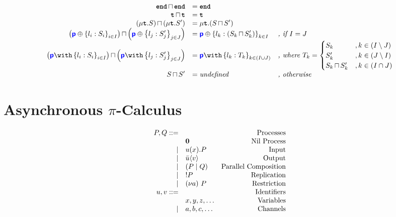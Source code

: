 \documentclass{article}
\begin{document}
\doublespacing
\[
\begin{array}{>{\displaystyle}r>{\displaystyle}ll}
		\tymerge{\tyend}{\tyend} & = \tyend &  \\
		\tymerge{\tyrecvar}{\tyrecvar} & = \tyrecvar &  \\
		\tymerge{\left(\tyrec{S}\right)}{\left(\tyrec{S'}\right)} & = \tyrec{\left(\tymerge{S}{S'}\right)} &  \\
		\tymerge{\left(\tysel{p}{l_i: S_i}{i \in I}\right)}{\left(\tysel{p}{l_j: S'_j}{j \in J}\right)} & = \tysel{p}{l_k: \left(\tymerge{S_k}{S'_k}\right)}{k \in I} &  \textit{, if $I = J$} \\
		\tymerge{\left(\tybra{p}{l_i: S_i}{i \in I}\right)}{\left(\tybra{p}{l_j: S'_j}{j \in J}\right)} & = \tybra{p}{l_k: T_k}{k \in (I \cup J)} & \textit{, where } T_k = \begin{cases}
S_k & , k \in \left(I \setminus J\right) \\
S'_k & , k \in \left(J \setminus I\right) \\
\tymerge{S_k}{S'_k} & , k \in \left(I \cap J\right)
\end{cases} \\
		\tymerge{S}{S'} & = \textit{undefined} & \textit{, otherwise}\\
\end{array}
\]
\singlespacing

\clearpage

\appendix

\section{Asynchronous $\pi$-Calculus}
\doublespacing
\[
\begin{array}{rlr}
    P, Q ::= & & \text{Processes} \\
     & \mathbf{0} & \text{Nil Process} \\
		\mid & {u}({x}).P & \text{Input} \\
		\mid & \bar{u}\langle {v} \rangle & \text{Output} \\
		\mid & \left({P}\mid{Q}\right) & \text{Parallel Composition} \\
		\mid & !{P} & \text{Replication} \\
		\mid & (\nu{a})~{P} & \text{Restriction} \\
    u, v ::= & & \text{Identifiers} \\
     & x, y, z, \dots & \text{Variables} \\
		\mid & a, b, c, \dots & \text{Channels} \\
\end{array}
\]
\singlespacing
\end{document}
